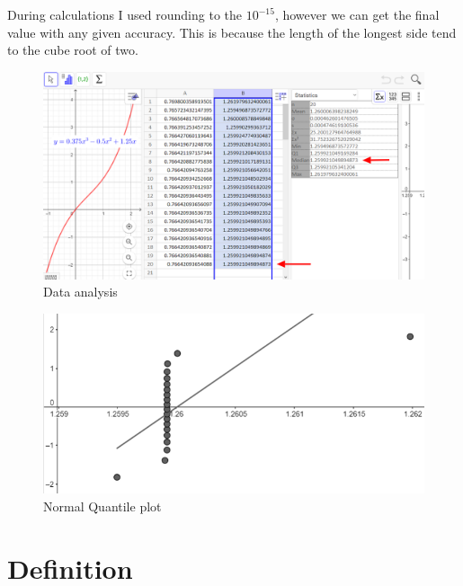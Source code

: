 \documentclass[12pt, letterpaper, oneside]{report}
\begin{document}
During calculations I used rounding to the  $10^{-15}$, however we can get the final value with any given accuracy. This is because the length of the longest side tend to the cube root of two.
\\
\begin{figure}[h]
	\centering
	\includegraphics[width=0.9\linewidth]{images/Table_arrow.png}
	\caption{Data analysis}
	\label{fig:data}
\end{figure}
\begin{figure}[h]
	\centering
	\includegraphics[width=0.9\linewidth]{images/plot.png}
	\caption{Normal Quantile plot}
	\label{fig:plot}
\end{figure}
\newpage

\section{Definition}
\end{document}
